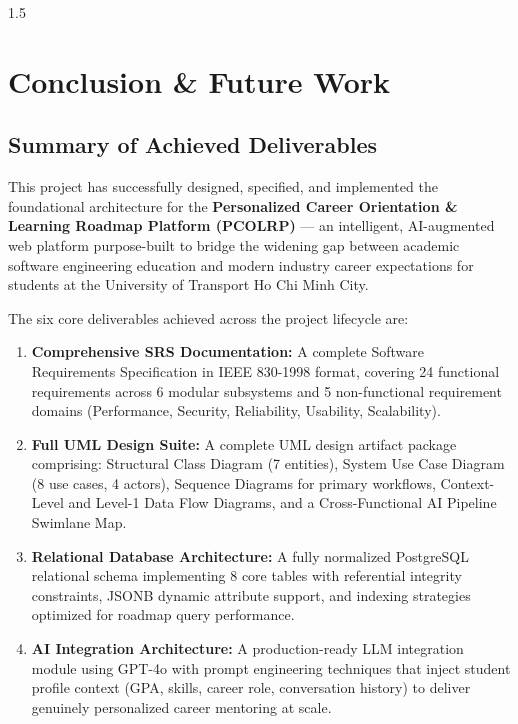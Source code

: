 \documentclass[12pt,a4paper]{report}
\begin{document}
\begin{spacing}{1.5}
		\chapter{Conclusion \& Future Work}
		
		\section{Summary of Achieved Deliverables}
		
		This project has successfully designed, specified, and implemented the foundational architecture for the \textbf{Personalized Career Orientation \& Learning Roadmap Platform (PCOLRP)} --- an intelligent, AI-augmented web platform purpose-built to bridge the widening gap between academic software engineering education and modern industry career expectations for students at the University of Transport Ho Chi Minh City.
		
		The six core deliverables achieved across the project lifecycle are:
		
		\begin{enumerate}
			\item \textbf{Comprehensive SRS Documentation:} A complete Software Requirements Specification in IEEE 830-1998 format, covering 24 functional requirements across 6 modular subsystems and 5 non-functional requirement domains (Performance, Security, Reliability, Usability, Scalability).
			
			\item \textbf{Full UML Design Suite:} A complete UML design artifact package comprising: Structural Class Diagram (7 entities), System Use Case Diagram (8 use cases, 4 actors), Sequence Diagrams for primary workflows, Context-Level and Level-1 Data Flow Diagrams, and a Cross-Functional AI Pipeline Swimlane Map.
			
			\item \textbf{Relational Database Architecture:} A fully normalized PostgreSQL relational schema implementing 8 core tables with referential integrity constraints, JSONB dynamic attribute support, and indexing strategies optimized for roadmap query performance.
			
			\item \textbf{AI Integration Architecture:} A production-ready LLM integration module using GPT-4o with prompt engineering techniques that inject student profile context (GPA, skills, career role, conversation history) to deliver genuinely personalized career mentoring at scale.
			

\end{enumerate}
\end{spacing}
\end{document}
